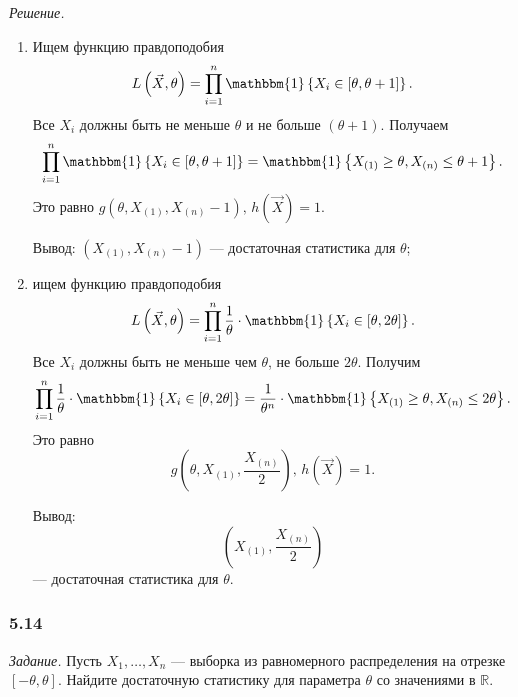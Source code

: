 \textit{Решение.}
\begin{enumerate}[label=\alph*)]
  \item Ищем функцию правдоподобия
  $$L \left( \vec{X}, \theta \right) =
    \prod \limits_{i = 1}^n
      \mathbbm{1} \left\{ X_i \in \left[ \theta, \theta + 1 \right] \right\}.$$
  Все $X_i$ должны быть не меньше $ \theta $ и не больше $ \left( \theta + 1 \right) $.
  Получаем
  $$ \prod \limits_{i = 1}^n
      \mathbbm{1} \left\{ X_i \in \left[ \theta, \theta + 1 \right] \right\} =
    \mathbbm{1} \left\{
      X_{ \left( 1 \right) } \geq \theta, X_{ \left( n \right) } \leq \theta + 1
    \right\}.$$
  Это равно $g \left( \theta, X_{ \left( 1 \right) }, X_{ \left( n \right) } - 1 \right), \,
    h \left( \vec{X} \right) = 1.$

  Вывод: $ \left( X_{ \left( 1 \right) }, X_{ \left( n \right) } - 1 \right) $ ---
  достаточная статистика для $ \theta $;
  \item ищем функцию правдоподобия
  $$L \left( \vec{X}, \theta \right) =
    \prod \limits_{i = 1}^n
      \frac{1}{ \theta } \cdot
      \mathbbm{1} \left\{ X_i \in \left[ \theta, 2 \theta \right] \right\}.$$
  Все $X_i$ должны быть не меньше чем $ \theta $, не больше $2 \theta $.
  Получим
  $$ \prod \limits_{i = 1}^n
      \frac{1}{ \theta } \cdot
      \mathbbm{1} \left\{ X_i \in \left[ \theta, 2 \theta \right] \right\} =
    \frac{1}{ \theta^n} \cdot
    \mathbbm{1} \left\{
      X_{ \left( 1 \right) } \geq \theta, X_{ \left( n \right) } \leq 2 \theta
    \right\}.$$
  Это равно
  $$g \left( \theta, X_{ \left( 1 \right) }, \frac{X_{ \left( n \right) }}{2} \right), \,
    h \left( \vec{X} \right) = 1.$$

  Вывод:
  $$ \left( X_{ \left( 1 \right) }, \frac{X_{ \left( n \right) }}{2} \right) $$
  --- достаточная статистика для $ \theta $.
\end{enumerate}

\subsubsection*{5.14}

\textit{Задание.}
Пусть $X_1, \dotsc, X_n$ ---
выборка из равномерного распределения на отрезке $ \left[ - \theta, \theta \right] $.
Найдите достаточную статистику для параметра $ \theta $ со значениями в $ \mathbb{R}$.

